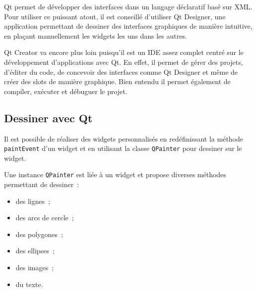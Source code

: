 Qt permet de développer des interfaces dans un langage déclaratif basé sur XML. Pour utiliser ce puissant atout, il est conseillé d'utiliser Qt Designer, une application permettant de dessiner des interfaces graphiques de manière intuitive, en plaçant manuellement les widgets les uns dans les autres.

Qt Creator va encore plus loin puisqu'il est un IDE assez complet centré sur le développement d'applications avec Qt. En effet, il permet de gérer des projets, d'éditer du code, de concevoir des interfaces comme Qt Designer et même de créer des slots de manière graphique. Bien entendu il permet également de compiler, exécuter et débuguer le projet.

\subsection{Dessiner avec Qt}

Il est possible de réaliser des widgets personnalisés en redéfinissant la méthode \verb|paintEvent| d'un widget et en utilisant la classe \verb|QPainter| pour dessiner sur le widget.

Une instance \verb|QPainter| est liée à un widget et propose diverses méthodes permettant de dessiner~:
\begin{itemize}
	\item des lignes~;
	\item des arcs de cercle~;
	\item des polygones~;
	\item des ellipses~;
	\item des images~;
	\item du texte.
\end{itemize}

